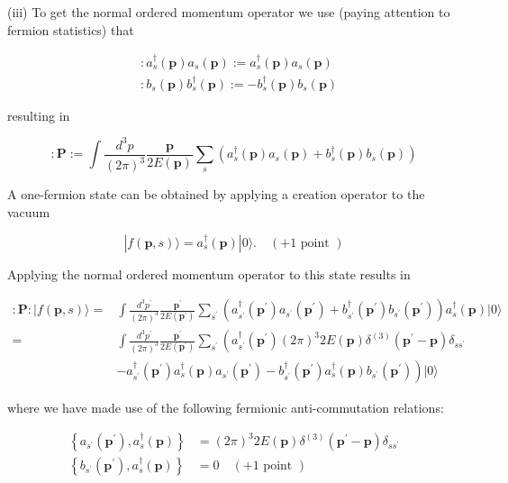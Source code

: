 \documentclass[10pt, letterpaper]{article}
\begin{document}
(iii) To get the normal ordered momentum operator we use (paying attention to fermion statistics) that

$$
\begin{aligned}
& : a_s^{\dagger}(\mathbf{p}) a_s(\mathbf{p}):=a_s^{\dagger}(\mathbf{p}) a_s(\mathbf{p}) \\
& : b_s(\mathbf{p}) b_s^{\dagger}(\mathbf{p}):=-b_s^{\dagger}(\mathbf{p}) b_s(\mathbf{p})
\end{aligned}
$$

resulting in

$$
: \mathbf{P}:=\int \frac{d^3 p}{(2 \pi)^3} \frac{\mathbf{p}}{2 E(\mathbf{p})} \sum_s\left(a_s^{\dagger}(\mathbf{p}) a_s(\mathbf{p})+b_s^{\dagger}(\mathbf{p}) b_s(\mathbf{p})\right)
$$


A one-fermion state can be obtained by applying a creation operator to the vacuum

$$
|f(\mathbf{p}, s)\rangle=a_s^{\dagger}(\mathbf{p})|0\rangle . \quad(+1 \text { point })
$$


Applying the normal ordered momentum operator to this state results in

$$
\begin{aligned}
: \mathbf{P}:|f(\mathbf{p}, s)\rangle= & \int \frac{d^3 p^{\prime}}{(2 \pi)^3} \frac{\mathbf{p}^{\prime}}{2 E\left(\mathbf{p}^{\prime}\right)} \sum_{s^{\prime}}\left(a_{s^{\prime}}^{\dagger}\left(\mathbf{p}^{\prime}\right) a_{s^{\prime}}\left(\mathbf{p}^{\prime}\right)+b_{s^{\prime}}^{\dagger}\left(\mathbf{p}^{\prime}\right) b_{s^{\prime}}\left(\mathbf{p}^{\prime}\right)\right) a_s^{\dagger}(\mathbf{p})|0\rangle \\
= & \int \frac{d^3 p^{\prime}}{(2 \pi)^3} \frac{\mathbf{p}^{\prime}}{2 E\left(\mathbf{p}^{\prime}\right)} \sum_{s^{\prime}}\left(a_{s^{\prime}}^{\dagger}\left(\mathbf{p}^{\prime}\right)(2 \pi)^3 2 E(\mathbf{p}) \delta^{(3)}\left(\mathbf{p}^{\prime}-\mathbf{p}\right) \delta_{s s^{\prime}}\right. \\
& \left.-a_{s^{\prime}}^{\dagger}\left(\mathbf{p}^{\prime}\right) a_s^{\dagger}(\mathbf{p}) a_{s^{\prime}}\left(\mathbf{p}^{\prime}\right)-b_{s^{\prime}}^{\dagger}\left(\mathbf{p}^{\prime}\right) a_s^{\dagger}(\mathbf{p}) b_{s^{\prime}}\left(\mathbf{p}^{\prime}\right)\right)|0\rangle
\end{aligned}
$$

where we have made use of the following fermionic anti-commutation relations:

$$
\begin{aligned}
\left\{a_{s^{\prime}}\left(\mathbf{p}^{\prime}\right), a_s^{\dagger}(\mathbf{p})\right\} & =(2 \pi)^3 2 E(\mathbf{p}) \delta^{(3)}\left(\mathbf{p}^{\prime}-\mathbf{p}\right) \delta_{s s^{\prime}} \\
\left\{b_{s^{\prime}}\left(\mathbf{p}^{\prime}\right), a_s^{\dagger}(\mathbf{p})\right\} & =0 \quad(+1 \text { point })
\end{aligned}
$$
\end{document}
